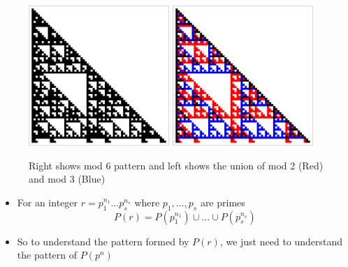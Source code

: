 \documentclass{beamer}
\begin{document}
\begin{frame}
    \begin{figure}
        \centering
        \includegraphics[width=0.475\textwidth]{Mod6.pdf}
        \hfill
        \includegraphics[width=0.475\textwidth]{mod2,3.pdf}
        \caption{Right shows mod 6 pattern and left shows the union of mod 2 (Red) and mod 3 (Blue)}
    \end{figure}
\end{frame}


\begin{frame}
    \begin{itemize}
        \item For an integer $r = p_1^{n_1}\dots p_s^{n_s}$ where $p_1,\dots,p_s$ are primes
        \begin{equation*}
            P(r) = P(p_1^{n_1}) \cup ... \cup P(p_s^{n_s})
        \end{equation*}
        \item So to understand the pattern formed by $P(r)$, we just need to understand the pattern of $P(p^n)$
    \end{itemize}
\end{frame}
\end{document}
